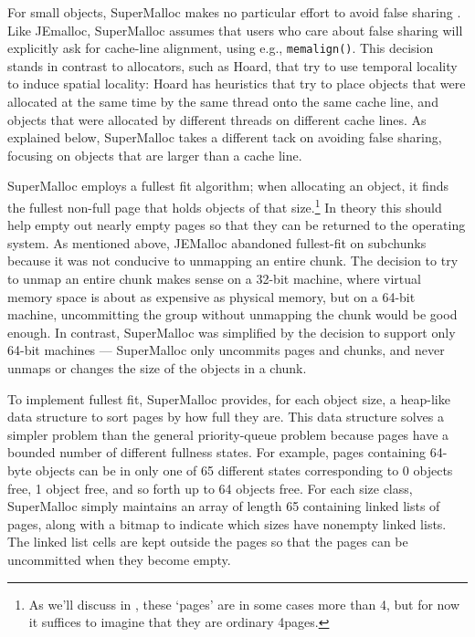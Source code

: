 \documentclass[natbib,sort&compress,10pt]{sigplanconf}
\newcommand{\code}[1]{\texttt{#1}}
\begin{document}
For small objects, SuperMalloc makes no particular effort to avoid
false sharing \cite{BoloskySc93}.  Like JEmalloc, SuperMalloc assumes
that users who care about false sharing will explicitly ask for
cache-line alignment, using e.g., \code{memalign()}.  This
decision stands in contrast to allocators, such as Hoard, that try to
use temporal locality to induce spatial locality: Hoard has heuristics
that try to place objects that were allocated at the same time by the
same thread onto the same cache line, and objects that were allocated
by different threads on different cache lines.  As explained below,
SuperMalloc takes a different tack on avoiding false sharing, focusing
on objects that are larger than a cache line.

SuperMalloc employs a fullest fit algorithm; when allocating an
object, it finds the fullest non-full page that holds objects of that
size.\footnote{As we'll discuss in , these `pages' are
  in some cases more than \unit{4}\kibi\byte, but for now it suffices
  to imagine that they are ordinary \unit{4}\kibi\byte pages.}  In
theory this should help empty out nearly empty pages so that they can
be returned to the operating system.  As mentioned above, JEMalloc
abandoned fullest-fit on subchunks because it was not conducive to
unmapping an entire chunk.  The decision to try to unmap an entire
chunk makes sense on a 32-bit machine, where virtual memory space is
about as expensive as physical memory, but on a 64-bit machine,
uncommitting the group without unmapping the chunk would be good
enough.  In contrast, SuperMalloc was simplified by the decision to
support only 64-bit machines --- SuperMalloc only uncommits pages and
chunks, and never unmaps or changes the size of the objects in a
chunk.

To implement fullest fit, SuperMalloc provides, for each object size,
a heap-like data structure to sort pages by how full they are.  This
data structure solves a simpler problem than the general
priority-queue problem because pages have a bounded number of
different fullness states.  For example, pages containing 64-byte
objects can be in only one of 65 different states corresponding to 0
objects free, 1 object free, and so forth up to 64 objects free.  For
each size class, SuperMalloc simply maintains an array of length 65
containing linked lists of pages, along with a bitmap to indicate
which sizes have nonempty linked lists.  The linked list cells are
kept outside the pages so that the pages can be uncommitted when they
become empty.
\end{document}
